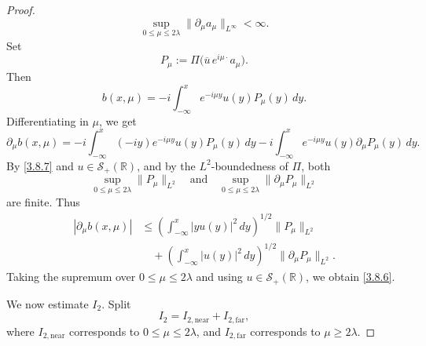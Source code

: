 \documentclass[10pt]{article}
\numberwithin{equation}{section}
\numberwithin{theorem}{section}
\begin{document}
\begin{proof}
\begin{equation}
\label{3.8.7}
\sup_{0\le\mu\le2\lambda}
\|\partial_\mu a_\mu\|_{L^\infty}<\infty .
\end{equation}
Set
\[
P_\mu:=\Pi\bigl(\overline u\,e^{i\mu\cdot}a_\mu\bigr).
\]
Then
\[
b(x,\mu)
=
-i\int_{-\infty}^x e^{-i\mu y}u(y)P_\mu(y)\,dy.
\]
Differentiating in \(\mu\), we get
\[
\partial_\mu b(x,\mu)
=
-i\int_{-\infty}^x
(-iy)e^{-i\mu y}u(y)P_\mu(y)\,dy
-i\int_{-\infty}^x
e^{-i\mu y}u(y)\partial_\mu P_\mu(y)\,dy .
\]
By \eqref{3.8.7} and \(u\in\mathcal S_{+}(\mathbb R)\), and by the \(L^2\)-boundedness of
\(\Pi\), both
\[
\sup_{0\le\mu\le2\lambda}\|P_\mu\|_{L^2}
\quad\text{and}\quad
\sup_{0\le\mu\le2\lambda}\|\partial_\mu P_\mu\|_{L^2}
\]
are finite. Thus
\[
\begin{aligned}
|\partial_\mu b(x,\mu)|
&\le
\left(\int_{-\infty}^x |y u(y)|^2\,dy\right)^{1/2}
\|P_\mu\|_{L^2}  \\
&\quad+
\left(\int_{-\infty}^x |u(y)|^2\,dy\right)^{1/2}
\|\partial_\mu P_\mu\|_{L^2}.
\end{aligned}
\]
Taking the supremum over \(0\le\mu\le2\lambda\) and using \(u\in\mathcal S_{+}(\mathbb R)\),
we obtain \eqref{3.8.6}.

We now estimate \(I_2\). Split
\[
I_2=I_{2,\mathrm{near}}+I_{2,\mathrm{far}},
\]
where \(I_{2,\mathrm{near}}\) corresponds to \(0\le\mu\le2\lambda\), and
\(I_{2,\mathrm{far}}\) corresponds to \(\mu\ge2\lambda\).


\end{proof}
\end{document}

